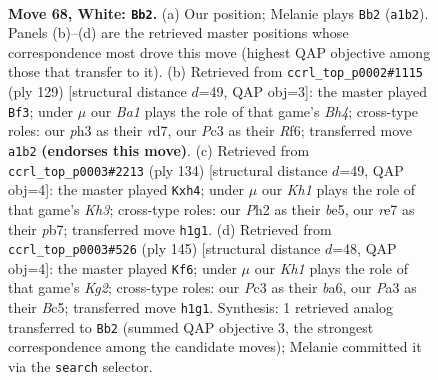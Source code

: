 \documentclass[11pt]{article}
\begin{document}
\clearpage

\begin{figure}[p]\centering
\begin{subfigure}{0.46\textwidth}\centering
\resizebox{\linewidth}{!}{%
\newchessgame
\chessboard[
  setfen={6k1/3nr3/6P1/8/p1p5/P1P4p/2P4P/B1R4K w - - 25 68},
  showmover=false,
  pgfstyle=straightmove, color=movearrow, markmove={a1-b2}
]}
\caption{}
\end{subfigure}\hfill
\begin{subfigure}{0.46\textwidth}\centering
\resizebox{\linewidth}{!}{%
\newchessgame
\chessboard[
  setfen={4r2k/3R4/p4r1p/P1p2p1b/2B2P2/7P/7K/1R6 b - - 5 65},
  showmover=false,
  pgfstyle=straightmove, color=movearrow, markmove={h5-f3}
]}
\caption{}
\end{subfigure}
\\[4pt]
\begin{subfigure}{0.46\textwidth}\centering
\resizebox{\linewidth}{!}{%
\newchessgame
\chessboard[
  setfen={5r2/1p2k3/8/pBpPb3/P6p/1P1R3K/8/8 w - - 0 68},
  showmover=false,
  pgfstyle=straightmove, color=movearrow, markmove={h3-h4}
]}
\caption{}
\end{subfigure}\hfill
\begin{subfigure}{0.46\textwidth}\centering
\resizebox{\linewidth}{!}{%
\newchessgame
\chessboard[
  setfen={8/2r3kp/Bp6/2bR1p1P/P1P2P2/7K/8/8 b - - 66 73},
  showmover=false,
  pgfstyle=straightmove, color=movearrow, markmove={g7-f6}
]}
\caption{}
\end{subfigure}
\caption{\textbf{Move 68, White: \texttt{Bb2}.} (a) Our position; Melanie plays \texttt{Bb2} (\texttt{a1b2}). Panels (b)--(d) are the retrieved master positions whose correspondence most drove this move (highest QAP objective among those that transfer to it). (b) Retrieved from \texttt{ccrl\_top\_p0002\#1115} (ply 129) [structural distance $d$=49, QAP obj=3]: the master played \texttt{Bf3}; under $\mu$ our \emph{Ba1} plays the role of that game's \emph{Bh4}; cross-type roles: our \emph{p}h3 as their \emph{r}d7, our \emph{P}c3 as their \emph{R}f6; transferred move \texttt{a1b2} \textbf{(endorses this move)}. (c) Retrieved from \texttt{ccrl\_top\_p0003\#2213} (ply 134) [structural distance $d$=49, QAP obj=4]: the master played \texttt{Kxh4}; under $\mu$ our \emph{Kh1} plays the role of that game's \emph{Kh3}; cross-type roles: our \emph{P}h2 as their \emph{b}e5, our \emph{r}e7 as their \emph{p}b7; transferred move \texttt{h1g1}. (d) Retrieved from \texttt{ccrl\_top\_p0003\#526} (ply 145) [structural distance $d$=48, QAP obj=4]: the master played \texttt{Kf6}; under $\mu$ our \emph{Kh1} plays the role of that game's \emph{Kg2}; cross-type roles: our \emph{P}c3 as their \emph{b}a6, our \emph{P}a3 as their \emph{B}c5; transferred move \texttt{h1g1}. Synthesis: 1 retrieved analog transferred to \texttt{Bb2} (summed QAP objective 3, the strongest correspondence among the candidate moves); Melanie committed it via the \texttt{search} selector.}
\label{fig:thought-m134}
\end{figure}
\end{document}
